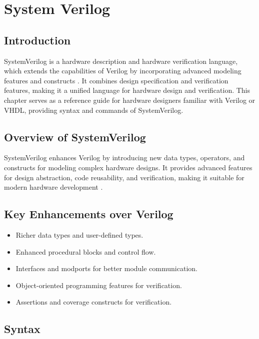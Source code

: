 \section{System Verilog}

\subsection{Introduction}
SystemVerilog is a hardware description and hardware verification language, which extends the capabilities of Verilog by incorporating advanced modeling features and constructs \cite{ieee1800-2017}. It combines design specification and verification features, making it a unified language for hardware design and verification. This chapter serves as a reference guide for hardware designers familiar with Verilog or VHDL, providing syntax and commands of SystemVerilog.

\subsection{Overview of SystemVerilog}
SystemVerilog enhances Verilog by introducing new data types, operators, and constructs for modeling complex hardware designs. It provides advanced features for design abstraction, code reusability, and verification, making it suitable for modern hardware development \cite{baker2010systemverilog}.

\subsection{Key Enhancements over Verilog}
\begin{itemize}
    \item Richer data types and user-defined types.
    \item Enhanced procedural blocks and control flow.
    \item Interfaces and modports for better module communication.
    \item Object-oriented programming features for verification.
    \item Assertions and coverage constructs for verification.
\end{itemize}

\subsection{Syntax}

